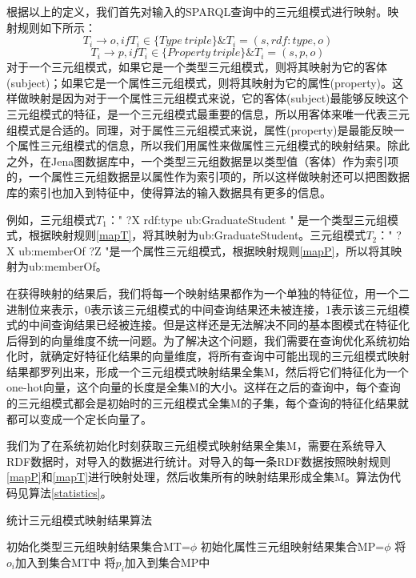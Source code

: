 根据以上的定义，我们首先对输入的SPARQL查询中的三元组模式进行映射。映射规则如下所示：
\begin{equation}
    \label{mapT}
    T_i \rightarrow o , if T_i \in \lbrace Type\ triple\rbrace \& T_i = (s,rdf:type,o)   
\end{equation}
\begin{equation}
    \label{mapP}
    T_i \rightarrow p, if T_i \in \lbrace Property\ triple\rbrace \& T_i = (s,p,o)   
\end{equation}
对于一个三元组模式，如果它是一个类型三元组模式，则将其映射为它的客体(subject)；如果它是一个属性三元组模式，则将其映射为它的属性(property)。这样做映射是因为对于一个属性三元组模式来说，它的客体(subject)最能够反映这个三元组模式的特征，是一个三元组模式最重要的信息，所以用客体来唯一代表三元组模式是合适的。同理，对于属性三元组模式来说，属性(property)是最能反映一个属性三元组模式的信息，所以我们用属性来做属性三元组模式的映射结果。除此之外，在Jena图数据库中，一个类型三元组数据昰以类型值（客体）作为索引项的，一个属性三元组数据昰以属性作为索引项的，所以这样做映射还可以把图数据库的索引也加入到特征中，使得算法的输入数据具有更多的信息。

例如，三元组模式$T_1$：" ?X rdf:type ub:GraduateStudent " 是一个类型三元组模式，根据映射规则\ref{mapT}，将其映射为ub:GraduateStudent。三元组模式$T_2$：" ?X ub:memberOf ?Z "是一个属性三元组模式，根据映射规则\ref{mapP}，所以将其映射为ub:memberOf。

在获得映射的结果后，我们将每一个映射结果都作为一个单独的特征位，用一个二进制位来表示，0表示该三元组模式的中间查询结果还未被连接，1表示该三元组模式的中间查询结果已经被连接。但是这样还是无法解决不同的基本图模式在特征化后得到的向量维度不统一问题。为了解决这个问题，我们需要在查询优化系统初始化时，就确定好特征化结果的向量维度，将所有查询中可能出现的三元组模式映射结果都罗列出来，形成一个三元组模式映射结果全集M，然后将它们特征化为一个one-hot向量，这个向量的长度是全集M的大小。这样在之后的查询中，每个查询的三元组模式都会是初始时的三元组模式全集M的子集，每个查询的特征化结果就都可以变成一个定长向量了。

我们为了在系统初始化时刻获取三元组模式映射结果全集M，需要在系统导入RDF数据时，对导入的数据进行统计。对导入的每一条RDF数据按照映射规则\ref{mapP}和\ref{mapT}进行映射处理，然后收集所有的映射结果形成全集M。算法伪代码见算法\ref{statistics}。
\begin{algorithm}[ht]
    \caption{统计三元组模式映射结果算法}
    \label{statistics}    
    初始化类型三元组映射结果集合MT=$\phi $\;
    初始化属性三元组映射结果集合MP=$\phi $\;
    {
        {
            将$o_i$加入到集合MT中\;
        }
        {
            将$p_i$加入到集合MP中\;
        }
    }
\end{algorithm} 

